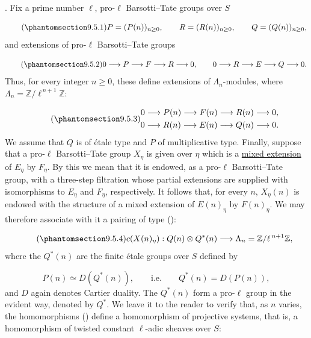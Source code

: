 
\medskip
\noindent
{}. Fix a prime number $\ell$, pro-$\ell$ Barsotti--Tate groups over $S$

\begin{equation}\tag{\SGARefTarget{sga7.sga7i.eix.n9-5-1}{9.5.1}}
P=(P(n))_{n\geq0},
\qquad R=(R(n))_{n\geq0},
\qquad Q=(Q(n))_{n\geq0},
\end{equation}
and extensions of pro-$\ell$ Barsotti--Tate groups

\begin{equation}\tag{\SGARefTarget{sga7.sga7i.eix.n9-5-2}{9.5.2}}
0\longrightarrow P\longrightarrow F\longrightarrow R\longrightarrow0,
\qquad
0\longrightarrow R\longrightarrow E\longrightarrow Q\longrightarrow0.
\end{equation}
Thus, for every integer $n\geq0$, these define extensions of
$\Lambda_n$-modules, where
$\Lambda_n=\mathbb Z/\ell^{\,n+1}\mathbb Z$:

\begin{equation}\tag{\SGARefTarget{sga7.sga7i.eix.n9-5-3}{9.5.3}}
\begin{gathered}
0\longrightarrow P(n)\longrightarrow F(n)\longrightarrow R(n)
 \longrightarrow0,\\
0\longrightarrow R(n)\longrightarrow E(n)\longrightarrow Q(n)
 \longrightarrow0.
\end{gathered}
\end{equation}
We assume that $Q$ is of étale type and $P$ of multiplicative type.
Finally, suppose that a pro-$\ell$ Barsotti--Tate group $X_\eta$ is given
over $\eta$ which is a \underline{mixed extension} of $E_\eta$ by $F_\eta$. By this
we mean that it is endowed, as a pro-$\ell$ Barsotti--Tate group, with a
three-step filtration whose partial extensions are supplied with
isomorphisms to $E_\eta$ and $F_\eta$, respectively. It follows that, for
every $n$, $X_\eta(n)$ is endowed with the structure of a mixed extension
of $E(n)_\eta$ by $F(n)_\eta$. We may therefore associate with it a pairing
of type ():

\begin{equation}\tag{\SGARefTarget{sga7.sga7i.eix.n9-5-4}{9.5.4}}
c(X(n)_\eta):Q(n)\otimes Q^*(n)
\longrightarrow\Lambda_n=\mathbb Z/\ell^{\,n+1}\mathbb Z,
\end{equation}
where the $Q^*(n)$ are the finite étale groups over $S$ defined by

\begin{equation*}
P(n)\simeq D(Q^*(n)),
\qquad\text{i.e.}\qquad Q^*(n)=D(P(n)),
\end{equation*}
and $D$ again denotes Cartier duality. The $Q^*(n)$ form a pro-$\ell$ group
in the evident way, denoted by $Q^*$. We leave it to the reader to verify
that, as $n$ varies, the homomorphisms () define a homomorphism of
projective systems, that is, a homomorphism of twisted constant
$\ell$-adic sheaves over $S$:

